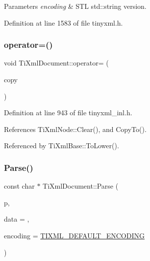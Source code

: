 \begin{DoxyParams}{Parameters}
{\em encoding} & S\+TL std\+::string version. \\
\hline
\end{DoxyParams}


Definition at line 1583 of file tinyxml.\+h.

\hypertarget{class_ti_xml_document_aafbfacc3414008f619b1345775ef12a4}{}\label{class_ti_xml_document_aafbfacc3414008f619b1345775ef12a4} 
\subsubsection{\texorpdfstring{operator=()}{operator=()}}
{\footnotesize\ttfamily void Ti\+Xml\+Document\+::operator= (\begin{DoxyParamCaption}\item[{const \hyperlink{class_ti_xml_document}{Ti\+Xml\+Document} \&}]{copy }\end{DoxyParamCaption})}



Definition at line 943 of file tinyxml\+\_\+inl.\+h.



References Ti\+Xml\+Node\+::\+Clear(), and Copy\+To().



Referenced by Ti\+Xml\+Base\+::\+To\+Lower().

\hypertarget{class_ti_xml_document_a789ad2f06f93d52bdb5570b2f3670289}{}\label{class_ti_xml_document_a789ad2f06f93d52bdb5570b2f3670289} 
\subsubsection{\texorpdfstring{Parse()}{Parse()}}
{\footnotesize\ttfamily const char $\ast$ Ti\+Xml\+Document\+::\+Parse (\begin{DoxyParamCaption}\item[{const char $\ast$}]{p,  }\item[{\hyperlink{class_ti_xml_parsing_data}{Ti\+Xml\+Parsing\+Data} $\ast$}]{data = {},  }\item[{\hyperlink{tinyxml_8h_a88d51847a13ee0f4b4d320d03d2c4d96}{Ti\+Xml\+Encoding}}]{encoding = {\ttfamily \hyperlink{tinyxml_8h_ad5b8b092878e9010d6400cb6c13d4879}{T\+I\+X\+M\+L\+\_\+\+D\+E\+F\+A\+U\+L\+T\+\_\+\+E\+N\+C\+O\+D\+I\+NG}} }\end{DoxyParamCaption})\hspace{0.3cm}{\ttfamily [virtual]}}

